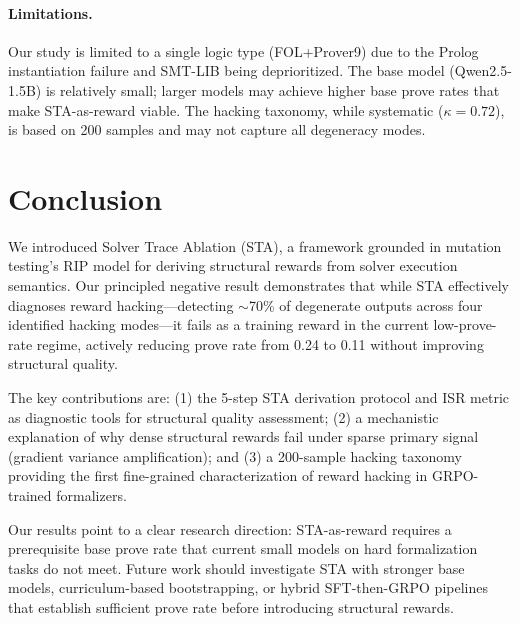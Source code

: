 \documentclass[11pt,a4paper]{article}
\begin{document}
\paragraph{Limitations.}
Our study is limited to a single logic type (FOL+Prover9) due to the Prolog instantiation failure and SMT-LIB being deprioritized.
The base model (Qwen2.5-1.5B) is relatively small; larger models may achieve higher base prove rates that make STA-as-reward viable.
The hacking taxonomy, while systematic ($\kappa = 0.72$), is based on 200 samples and may not capture all degeneracy modes.

\section{Conclusion}

We introduced Solver Trace Ablation (STA), a framework grounded in mutation testing's RIP model for deriving structural rewards from solver execution semantics.
Our principled negative result demonstrates that while STA effectively diagnoses reward hacking---detecting $\sim$70\% of degenerate outputs across four identified hacking modes---it fails as a training reward in the current low-prove-rate regime, actively reducing prove rate from 0.24 to 0.11 without improving structural quality.

The key contributions are: (1) the 5-step STA derivation protocol and ISR metric as diagnostic tools for structural quality assessment; (2) a mechanistic explanation of why dense structural rewards fail under sparse primary signal (gradient variance amplification); and (3) a 200-sample hacking taxonomy providing the first fine-grained characterization of reward hacking in GRPO-trained formalizers.

Our results point to a clear research direction: STA-as-reward requires a prerequisite base prove rate that current small models on hard formalization tasks do not meet.
Future work should investigate STA with stronger base models, curriculum-based bootstrapping, or hybrid SFT-then-GRPO pipelines that establish sufficient prove rate before introducing structural rewards.
\end{document}
